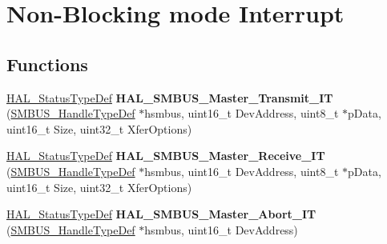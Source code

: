 \hypertarget{group___non-_blocking__mode___interrupt}{}\section{Non-\/\+Blocking mode Interrupt}
\label{group___non-_blocking__mode___interrupt}
\subsection*{Functions}
\begin{DoxyCompactItemize}
\item 
\mbox{\label{group___non-_blocking__mode___interrupt_gacbf8f48c6a407d0c7c82fb5d37eb2b8f}} 
\hyperlink{stm32f0xx__hal__def_8h_a63c0679d1cb8b8c684fbb0632743478f}{H\+A\+L\+\_\+\+Status\+Type\+Def} {\bfseries H\+A\+L\+\_\+\+S\+M\+B\+U\+S\+\_\+\+Master\+\_\+\+Transmit\+\_\+\+IT} (\hyperlink{struct_s_m_b_u_s___handle_type_def}{S\+M\+B\+U\+S\+\_\+\+Handle\+Type\+Def} $\ast$hsmbus, uint16\+\_\+t Dev\+Address, uint8\+\_\+t $\ast$p\+Data, uint16\+\_\+t Size, uint32\+\_\+t Xfer\+Options)
\item 
\mbox{\label{group___non-_blocking__mode___interrupt_gab9d8d52f797123b8d61ed44adf2b392e}} 
\hyperlink{stm32f0xx__hal__def_8h_a63c0679d1cb8b8c684fbb0632743478f}{H\+A\+L\+\_\+\+Status\+Type\+Def} {\bfseries H\+A\+L\+\_\+\+S\+M\+B\+U\+S\+\_\+\+Master\+\_\+\+Receive\+\_\+\+IT} (\hyperlink{struct_s_m_b_u_s___handle_type_def}{S\+M\+B\+U\+S\+\_\+\+Handle\+Type\+Def} $\ast$hsmbus, uint16\+\_\+t Dev\+Address, uint8\+\_\+t $\ast$p\+Data, uint16\+\_\+t Size, uint32\+\_\+t Xfer\+Options)
\item 
\mbox{\label{group___non-_blocking__mode___interrupt_ga753f06add5574ae7a77f1e03796097d5}} 
\hyperlink{stm32f0xx__hal__def_8h_a63c0679d1cb8b8c684fbb0632743478f}{H\+A\+L\+\_\+\+Status\+Type\+Def} {\bfseries H\+A\+L\+\_\+\+S\+M\+B\+U\+S\+\_\+\+Master\+\_\+\+Abort\+\_\+\+IT} (\hyperlink{struct_s_m_b_u_s___handle_type_def}{S\+M\+B\+U\+S\+\_\+\+Handle\+Type\+Def} $\ast$hsmbus, uint16\+\_\+t Dev\+Address)
\item 
\mbox{\label{group___non-_blocking__mode___interrupt_gaed5ff89636397bfbc0d418b9044c1837}} 

\end{DoxyCompactItemize}
